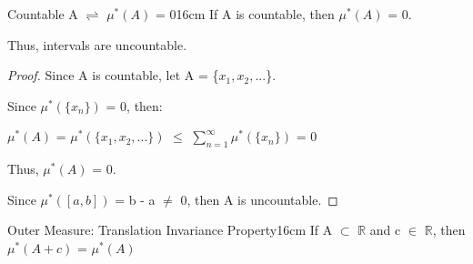     \vspace{0.5cm}



    \begin{corollary}{Countable A $\rightleftharpoons$ $\mu^*(A)$ = 0}{16cm}
        If A is countable, then $\mu^*(A)$ = 0.

        Thus, intervals are uncountable.
    \end{corollary}

    \begin{proof}
        Since A is countable, let A = \{$x_1,x_2,...$\}.
        
        Since $\mu^*(\{x_n\})$ = 0, then:
        
        \hspace{0.5cm}
        $\mu^*(A)$
        = $\mu^*(\{x_1,x_2,...\})$
        $\leq$ $\sum_{n=1}^{\infty} \mu^*(\{x_n\})$
        = 0

        Thus, $\mu^*(A)$ = 0.

        Since $\mu^*([a,b])$ = b - a $\not =$ 0, then A is uncountable. 
    \end{proof}

    \vspace{0.5cm}



    \begin{wtheorem}{Outer Measure: Translation Invariance Property}{16cm}
        If A $\subset$ $\mathbb{R}$ and c $\in$ $\mathbb{R}$, then
        $\mu^*(A+c)$ = $\mu^*(A)$
    \end{wtheorem}

